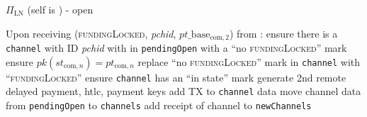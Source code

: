 \begin{protocolbox}{$\Pi_{\mathrm{LN}}$ (self is \alice) - open}
\begin{algorithmic}[1]
    \State Upon receiving (\textsc{fundingLocked}, \textit{pchid},
    $pt\_\mathrm{base}_{\mathrm{com}, 2}$) from \bob:
    \Indent
      \State ensure there is a \texttt{channel} with ID \textit{pchid} with
      \bob{} in \texttt{pendingOpen} with a ``no \textsc{fundingLocked}'' mark
      \State ensure $pk\left(st_{\mathrm{com}, n}\right) = pt_{\mathrm{com}, n}$
      \State replace ``no \textsc{fundingLocked}'' mark in \texttt{channel} with
      ``\textsc{fundingLocked}''
      \State ensure \texttt{channel} has an ``in state'' mark
      \State generate 2nd remote delayed payment, htlc, payment keys
      \State add TX to \texttt{channel} data
      \State move channel data from \texttt{pendingOpen} to \texttt{channels}
      \State add receipt of channel to \texttt{newChannels}
    \EndIndent
    \State
  \end{algorithmic}
\end{protocolbox}

